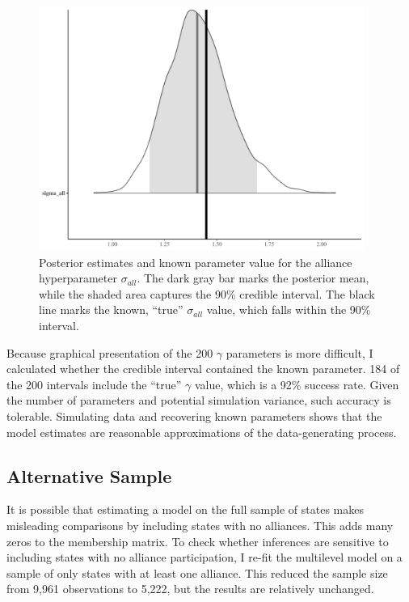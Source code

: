 \documentclass[12pt]{article}
\begin{document}
\begin{figure}[htbp]
	\centering
		\includegraphics[width=0.95\textwidth]{sall-sim-res.pdf}
	\caption{Posterior estimates and known parameter value for the alliance hyperparameter $\sigma_{all}$. The dark gray bar marks the posterior mean, while the shaded area captures the 90\% credible interval. The black line marks the known, ``true'' $\sigma_{all}$ value, which falls within the 90\% interval.}
	\label{fig:sall-sim-res}
\end{figure}


Because graphical presentation of the 200 $\gamma$ parameters is more difficult, I calculated whether the credible interval contained the known parameter. 
184 of the 200 intervals include the ``true'' $\gamma$ value, which is a 92\% success rate. 
Given the number of parameters and potential simulation variance, such accuracy is tolerable. 
Simulating data and recovering known parameters shows that the model estimates are reasonable approximations of the data-generating process. 
 



\subsection{Alternative Sample} 


It is possible that estimating a model on the full sample of states makes misleading comparisons by including states with no alliances.
This adds many zeros to the membership matrix. 
To check whether inferences are sensitive to including states with no alliance participation, I re-fit the multilevel model on a sample of only states with at least one alliance. 
This reduced the sample size from 9,961 observations to 5,222, but the results are relatively unchanged. 
\end{document}
